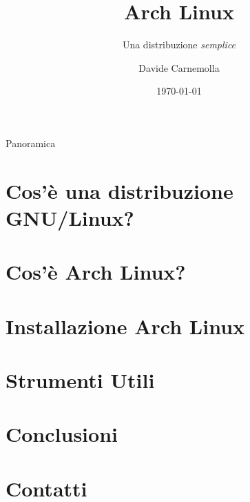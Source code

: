 \documentclass[aspectratio=43,xcolor=dvipsnames]{beamer}
\title{Arch Linux}
\subtitle{Una distribuzione \emph{semplice}}
\author {Davide Carnemolla}
\institute %
{
    Dipartimento di Matematica e Informatica \\
    Università degli Studi di Catania
    \vskip 3pt
}
\date{\today} %
\begin{document}
\begin{frame}
    \titlepage
\end{frame}

\begin{frame}{Panoramica}
    \tableofcontents
\end{frame}

\section{Cos'è una distribuzione GNU/Linux?}


\section{Cos'è Arch Linux?}


\section{Installazione Arch Linux}


\section{Strumenti Utili}


\section{Conclusioni}


\section{Contatti}


\end{document}
